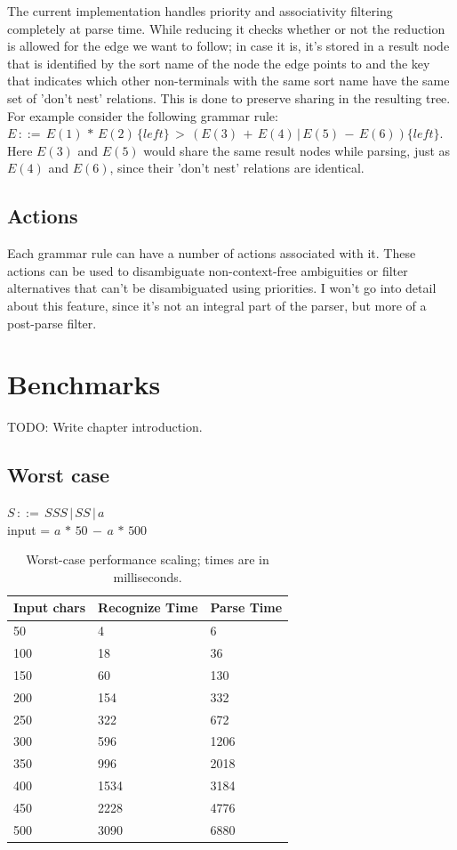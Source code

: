 \documentclass[a4paper,10pt]{article}
\begin{document}
The current implementation handles priority and associativity filtering completely at parse time. While reducing it checks whether or not the reduction is allowed for the edge we want to follow; in case it is, it's stored in a result node that is identified by the sort name of the node the edge points to and the key that indicates which other non-terminals with the same sort name have the same set of 'don't nest' relations. This is done to preserve sharing in the resulting tree. For example consider the following grammar rule: $E\,::=\,E(1)\,*\,E(2)\,\{left\}\,>\,(E(3)\,+\,E(4)\,|\,E(5)\,-\,E(6))\{left\}$. Here $E(3)$ and $E(5)$ would share the same result nodes while parsing, just as $E(4)$ and $E(6)$, since their 'don't nest' relations are identical.

\subsection{Actions}

Each grammar rule can have a number of actions associated with it. These actions can be used to disambiguate non-context-free ambiguities or filter alternatives that can't be disambiguated using priorities. I won't go into detail about this feature, since it's not an integral part of the parser, but more of a post-parse filter.

\section{Benchmarks}

TODO: Write chapter introduction.

\subsection{Worst case}

$S\,::=\,SSS\,|\,SS\,|\,a$\\
input = $a\,*\,50\,-\,a\,*\,500$

\begin{table}[H]
\centering
\begin{tabular}{ | p{5em} | p{7em} | p{6em} | }
  \hline
  Input chars & Recognize Time & Parse Time \\
  \hline
  50 & 4 & 6 \\
  100 & 18 & 36 \\
  150 & 60 & 130 \\
  200 & 154 & 332 \\
  250 & 322 & 672 \\
  300 & 596 & 1206 \\
  350 & 996 & 2018 \\
  400 & 1534 & 3184 \\
  450 & 2228 & 4776 \\
  500 & 3090 & 6880 \\
  \hline
\end{tabular}
\caption{Worst-case performance scaling; times are in milliseconds.}
\end{table}
\end{document}
